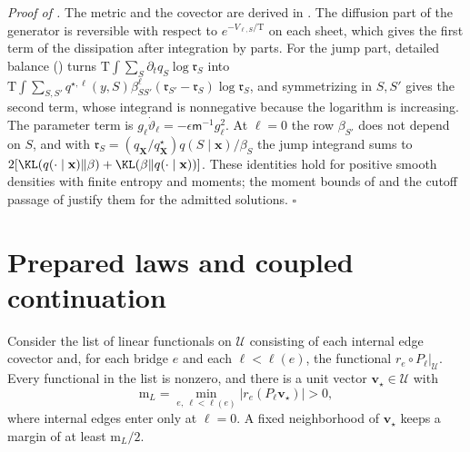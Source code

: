 \noindent\emph{Proof of .}
The metric and the covector are derived in .
The diffusion part of the generator is reversible with respect to
\(e^{-V_{\ell,S}/\mathrm T}\) on each sheet, which gives the first term of the
dissipation after integration by parts. For the jump part, detailed balance
() turns
\(\mathrm T\int\sum_S\partial_tq_S\log\mathfrak r_S\) into
\(\mathrm T\int\sum_{S,S'}q^{\star,\ell}(y,S)\beta^\ell_{SS'}
(\mathfrak r_{S'}-\mathfrak r_S)\log\mathfrak r_S\), and symmetrizing in
\(S,S'\) gives the second term, whose integrand is nonnegative because the
logarithm is increasing. The parameter term is
\(g_\ell\dot\vartheta_\ell=-\epsilon\mathsf m^{-1}g_\ell^2\). At \(\ell=0\) the
row \(\beta_{S'}\) does not depend on \(S\), and with
\(\mathfrak r_S=(q_{\mathbf X}/q^\star_{\mathbf X}) q(S\mid\mathbf x)/\beta_S\)
the jump integrand sums to
\(2[\KL(q(\cdot\mid\mathbf x)\Vert\beta)+\KL(\beta\Vert q(\cdot\mid\mathbf x))]\).
These identities hold for positive smooth densities with finite entropy and
moments; the moment bounds of  and
the cutoff passage of  justify them for
the admitted solutions. \(\square\)

\section{Prepared laws and coupled continuation}
\label{sec:rg-formation-continuation-proof}

Consider the list of linear functionals on \(\mathcal U\) consisting of each
internal edge covector and, for each bridge \(e\) and each \(\ell<\ell(e)\),
the functional \(r_e\circ P_\ell|_{\mathcal U}\). Every functional in the list
is nonzero, and there is a unit vector \(\mathbf v_\star\in\mathcal U\) with
\begin{equation}
\mathrm m_L=\min_{e,\ \ell<\ell(e)}
       |r_e(P_\ell\mathbf v_\star)|>0,
\label{eq:rg-formation-preparation-margin}
\end{equation}
where internal edges enter only at \(\ell=0\). A fixed neighborhood of
\(\mathbf v_\star\) keeps a margin of at least \(\mathrm m_L/2\).

